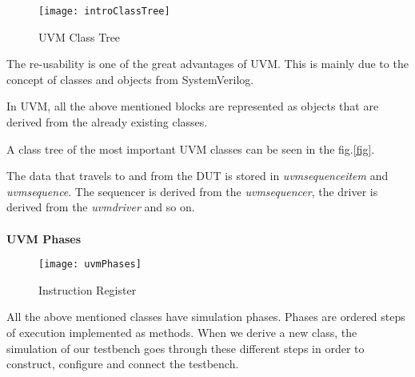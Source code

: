 \documentclass[a4paper,11pt]{article}
\begin{document}
\begin{figure}[ht]
\centering
\texttt{[image: introClassTree]}
\caption{UVM Class Tree}
\end{figure}

The re-usability is one of the great advantages of UVM. This is mainly due to the concept of classes and objects from SystemVerilog.

In UVM, all the above mentioned blocks are represented as objects that are derived from the already existing classes.

A class tree of the most important UVM classes can be seen in the fig.\ref{fig}.

The data that travels to and from the DUT is stored in \textit{uvm\textunderscore sequence\textunderscore item} and \textit{uvm\textunderscore sequence}. The sequencer is derived from the \textit{uvm\textunderscore sequencer}, the driver is derived from the \textit{uvm\textunderscore driver} and so on.
\ \\
\ \\
\textbf{UVM Phases}
\ \\

\begin{figure}[ht]
\centering
\texttt{[image: uvmPhases]}
\caption{Instruction Register}
\end{figure}

All the above mentioned classes have simulation phases. Phases are ordered steps of execution implemented as methods. When we derive a new class, the simulation of our testbench goes through these different steps in order to construct, configure and connect the testbench.
\end{document}
